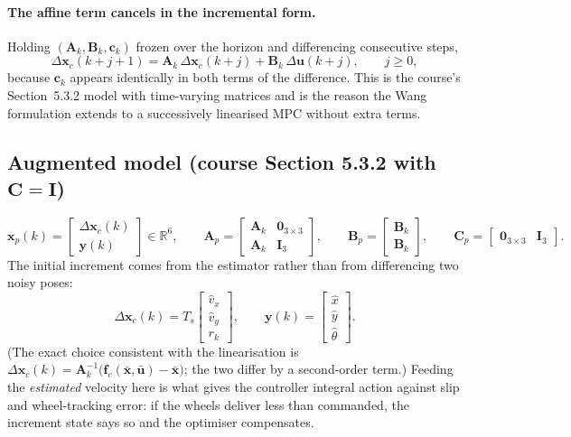 \documentclass[11pt,a4paper]{article}
\newcommand{\vect}[1]{\bm{#1}}
\newcommand{\mat}[1]{\bm{#1}}
\newcommand{\Real}{\mathbb{R}}
\newcommand{\du}{\Delta\vect{u}}
\newcommand{\Ts}{T_s}
\begin{document}
\paragraph{The affine term cancels in the incremental form.} Holding $(\mat A_k,\mat B_k,\vect c_k)$ frozen over the horizon and differencing consecutive steps,
\begin{equation}
\Delta\vect x_c(k+j+1) = \mat A_k\,\Delta\vect x_c(k+j) + \mat B_k\,\du(k+j),\qquad j\ge 0,
\end{equation}
because $\vect c_k$ appears identically in both terms of the difference. This is the course's Section~5.3.2 model with time-varying matrices and is the reason the Wang formulation extends to a successively linearised MPC without extra terms.

\subsection{Augmented model (course Section 5.3.2 with \texorpdfstring{$\mat C=\mat I$}{C = I})}
\begin{equation}
\vect x_p(k) = \begin{bmatrix}\Delta\vect x_c(k)\\ \vect y(k)\end{bmatrix}\in\Real^6,
\qquad
\mat A_p = \begin{bmatrix}\mat A_k & \mat 0_{3\times 3}\\ \mat A_k & \mat I_3\end{bmatrix},
\qquad
\mat B_p = \begin{bmatrix}\mat B_k\\ \mat B_k\end{bmatrix},
\qquad
\mat C_p = \begin{bmatrix}\mat 0_{3\times 3} & \mat I_3\end{bmatrix}.
\label{eq:aug}
\end{equation}
The initial increment comes from the estimator rather than from differencing two noisy poses:
\begin{equation}
\Delta\vect x_c(k) = \Ts\begin{bmatrix}\hat v_x \\ \hat v_y \\ r_k\end{bmatrix},
\qquad
\vect y(k) = \begin{bmatrix}\hat x\\ \hat y\\ \hat\theta\end{bmatrix}.
\label{eq:xp0}
\end{equation}
(The exact choice consistent with the linearisation is $\Delta\vect x_c(k)=\mat A_k^{-1}\big(\vect f_c(\bar{\vect x},\bar{\vect u})-\bar{\vect x}\big)$; the two differ by a second-order term.) Feeding the \emph{estimated} velocity here is what gives the controller integral action against slip and wheel-tracking error: if the wheels deliver less than commanded, the increment state says so and the optimiser compensates.
\end{document}
